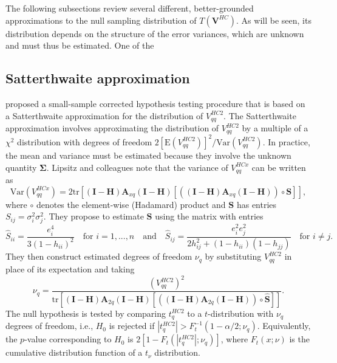 \documentclass[12pt]{article}\usepackage[]{graphicx}\usepackage[]{color}
\newcommand{\E}{\text{E}}
\newcommand{\Var}{\text{Var}}
\newcommand{\tr}{\text{tr}}
\newcommand{\bm}{\mathbf}
\newcommand{\bs}{\boldsymbol}
\begin{document}
The following subsections review several different, better-grounded approximations to the null sampling distribution of $T\left(\bm{V}^{HC}\right)$. As will be seen, its distribution depends on the structure of the error variances, which are unknown and must thus be estimated. One of the 

\subsection{Satterthwaite approximation} 

\citet{Lipsitz1999degrees} proposed a small-sample corrected hypothesis testing procedure that is based on a Satterthwaite approximation for the distribution of $V^{HC2}_{qq}$. The Satterthwaite approximation involves approximating the distribution of $V^{HC2}_{qq}$ by a multiple of a $\chi^2$ distribution with degrees of freedom $2 \left[\E\left(V^{HC2}_{qq}\right)\right]^2 / \Var\left(V^{HC2}_{qq}\right)$. In practice, the mean and variance must be estimated because they involve the unknown quantity $\bs\Sigma$. Lipsitz and colleagues note that the variance of $V^{HCx}_{qq}$ can be written as \[
\Var\left(V^{HCx}_{qq}\right) = 2\tr\left[\left(\bm{I} - \bm{H}\right)\bm{A}_{xq} \left(\bm{I} - \bm{H}\right)\left[\left(\left(\bm{I} - \bm{H}\right)\bm{A}_{xq} \left(\bm{I} - \bm{H}\right)\right)\circ \bm{S}\right]\right], \]
where $\circ$ denotes the element-wise (Hadamard) product and $\bm{S}$ has entries $S_{ij} = \sigma_i^2 \sigma_j^2$. They propose to estimate $\bm{S}$ using the matrix with entries \[
\hat{S}_{ii} = \frac{e_i^4}{3(1 - h_{ii})^2} \quad \text{for } i = 1,...,n \quad \text{and} \quad \hat{S}_{ij} = \frac{e_i^2 e_j^2}{2 h_{ij}^2 + (1 - h_{ii})(1 - h_{jj})} \quad \text{for } i \neq j. \]
They then construct estimated degrees of freedom $\nu_q$ by substituting $V^{HC2}_{qq}$ in place of its expectation and taking 
\begin{equation}
\label{eq:Satterthwaite}
\nu_q = \frac{\left(V^{HC2}_{qq}\right)^2}{\tr\left[\left(\bm{I} - \bm{H}\right)\bm{A}_{2q} \left(\bm{I} - \bm{H}\right)\left[\left(\left(\bm{I} - \bm{H}\right)\bm{A}_{2q} \left(\bm{I} - \bm{H}\right)\right)\circ \bm{\hat{S}}\right]\right]}.
\end{equation}
The null hypothesis is tested by comparing $t^{HC2}_q$ to a $t$-distribution with $\nu_q$ degrees of freedom, i.e., $H_0$ is rejected if $|t^{HC2}_q| > F_t^{-1}(1 - \alpha / 2; \nu_q)$. Equivalently, the $p$-value corresponding to $H_0$ is $2 \left[1 - F_t\left(|t_q^{HC2}|; \nu_q\right)\right]$, where $F_t(x; \nu)$ is the cumulative distribution function of a $t_\nu$ distribution.
\end{document}
